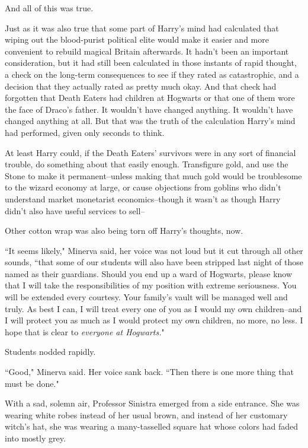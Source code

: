 And all of this was true.

Just as it was also true that some part of Harry's mind had calculated that wiping out the blood-purist political elite would make it easier and more convenient to rebuild magical Britain afterwards. It hadn't been an important consideration, but it had still been calculated in those instants of rapid thought, a check on the long-term consequences to see if they rated as catastrophic, and a decision that they actually rated as pretty much okay. And that check had forgotten that Death Eaters had children at Hogwarts or that one of them wore the face of Draco's father. It wouldn't have changed anything. It wouldn't have changed anything at all. But that was the truth of the calculation Harry's mind had performed, given only seconds to think.

At least Harry could, if the Death Eaters' survivors were in any sort of financial trouble, do something about that easily enough. Transfigure gold, and use the Stone to make it permanent\---unless making that much gold would be troublesome to the wizard economy at large, or cause objections from goblins who didn't understand market monetarist economics\---though it wasn't as though Harry didn't also have useful services to sell\---

Other cotton wrap was also being torn off Harry's thoughts, now.

``It seems likely," Minerva said, her voice was not loud but it cut through all other sounds, ``that some of our students will also have been stripped last night of those named as their guardians. Should you end up a ward of Hogwarts, please know that I will take the responsibilities of my position with extreme seriousness. You will be extended every courtesy. Your family's vault will be managed well and truly. As best I can, I will treat every one of you as I would my own children\---and I will protect you as much as I would protect my own children, no more, no less. I hope that is clear to \emph{everyone at Hogwarts.}"

Students nodded rapidly.

``Good," Minerva said. Her voice sank back. ``Then there is one more thing that must be done."

With a sad, solemn air, Professor Sinistra emerged from a side entrance. She was wearing white robes instead of her usual brown, and instead of her customary witch's hat, she was wearing a many-tasselled square hat whose colors had faded into mostly grey.

